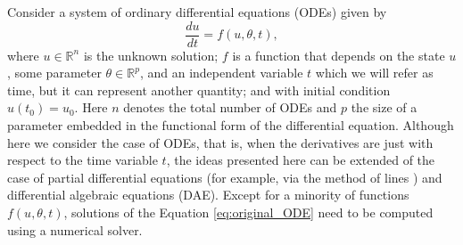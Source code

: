 Consider a system of ordinary differential equations (ODEs) given by
\begin{equation}
 \frac{du}{dt} = f(u, \theta, t),
 \label{eq:original_ODE}
\end{equation}
where $u \in \mathbb{R}^n$ is the unknown solution; $f$ is a function that depends on the state $u$, some parameter $\theta \in \mathbb R^p$, and an independent variable $t$ which we will refer as time, but it can represent another quantity; and with initial condition $u(t_0) = u_0$.
Here $n$ denotes the total number of ODEs and $p$ the size of a parameter embedded in the functional form of the differential equation.
Although here we consider the case of ODEs, that is, when the derivatives are just with respect to the time variable $t$, the ideas presented here can be extended of the case of partial differential equations (for example, via the method of lines \cite{ascher2008numerical}) and differential algebraic equations (DAE).
Except for a minority of functions $f(u,\theta, t)$, solutions of the Equation \eqref{eq:original_ODE} need to be computed using a numerical solver. 

